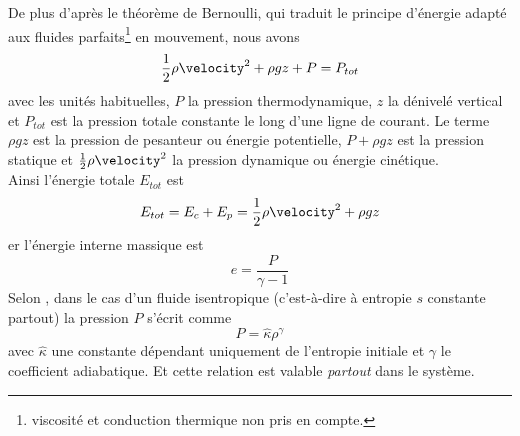 De plus d'après le théorème de Bernoulli, qui traduit le principe d'énergie adapté aux fluides parfaits\footnote{viscosité et conduction thermique non pris en compte.} en mouvement, nous avons
\begin{equation}
	\frac{1}{2}\rho\velocity^2 + \rho g z + P = P_{tot}\label{eq:bernoulli}
\end{equation}
avec les unités habituelles, $P$ la pression thermodynamique, $z$ la dénivelé vertical et $P_{tot}$ est la pression totale constante le long d'une ligne de courant. Le terme $\rho g z$ est la pression de pesanteur ou énergie potentielle, $P+\rho g z$ est la pression statique et $\frac{1}{2}\rho \velocity^2$ la pression dynamique ou énergie cinétique.\\

\noindent Ainsi l'énergie totale $E_{tot}$ est 
\begin{equation}
	E_{tot} = E_c + E_p = \frac{1}{2}\rho\velocity^2 + \rho g z \label{eq:energytotal}
\end{equation}
er l'énergie interne massique est 
\begin{equation}
	e = \frac{P}{\gamma - 1} \label{eq:energyintern}
\end{equation}
Selon \citet{leveque_numerical_1992}, dans le cas d'un fluide isentropique (c'est-à-dire à entropie $s$ constante partout) la pression $P$ s'écrit comme
\[ P = \hat{\kappa}\rho^\gamma\]
avec $\hat{\kappa}$ une constante dépendant uniquement de l'entropie initiale et $\gamma$ le coefficient adiabatique. Et cette relation est valable \textit{partout} dans le système.